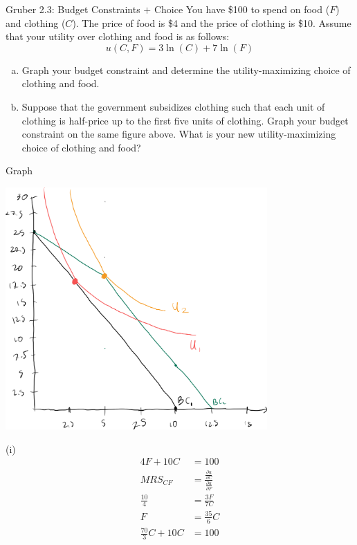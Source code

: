 \documentclass[10pt]{extarticle}
\title{}
\author{Avinash Iyer}
\date{}
\begin{document}
{
  \begin{problem}{Gruber 2.3: Budget Constraints $+$ Choice}
    You have \$100 to spend on food ($F$) and clothing ($C$). The price of food is \$4 and the price of clothing is \$10. Assume that your utility over clothing and food is as follows:
    \[
      u(C,F) = 3\ln(C) + 7\ln(F)
    \] 
    \begin{enumerate}[(a)]
      \item Graph your budget constraint and determine the utility-maximizing choice of clothing and food.
      \item Suppose that the government subsidizes clothing such that each unit of clothing is half-price up to the first five units of clothing. Graph your budget constraint on the same figure above. What is your new utility-maximizing choice of clothing and food?
    \end{enumerate}
    \tcblower
    \begin{problem}{Graph}
      \begin{center}
        \includegraphics[width=10cm]{1_1}
      \end{center}
    \end{problem}
    \begin{problem}{(i)}
      \begin{align*}
        4F + 10C &= 100 \tag*{budget constraint}\\
        MRS_{CF} &= \frac{\frac{\partial u}{\partial C}}{\frac{\partial u}{\partial F}} \\
        \frac{10}{4}&= \frac{3F}{7C} \\
        F &= \frac{35}{6}C\\
        \frac{70}{3}C + 10C &= 100 \\

\end{align*}
\end{problem}
\end{problem}}
\end{document}
